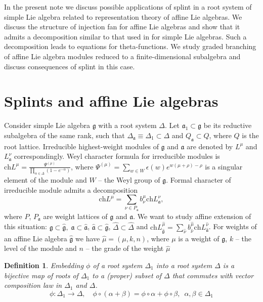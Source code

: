 \documentclass[12pt]{article}
\newtheorem{Def}{Definition}[section]
\newcommand{\gf}{\mathfrak{g}}
\newcommand{\af}{\mathfrak{a}}
\newcommand{\gfh}{\hat{\mathfrak{g}}}
\newcommand{\afh}{\hat{\mathfrak{a}}}
\begin{document}
In the present note we discuss possible applications of splint in
a root system of simple Lie algebra related to representation
theory of affine Lie algebras. We discuss the structure of
injection fan for affine Lie algebras and show that it admits a
decomposition similar to that used in \cite{2011arXiv1111.6787L}
for simple Lie algebras. Such a decomposition leads to equations
for theta-functions. We study graded branching of affine Lie
algebra modules reduced to a finite-dimensional subalgebra and
discuss consequences of splint in this case.

\section{Splints and affine Lie algebras}
\label{sec:definitions}

Consider simple Lie algebra $\gf$ with a root system $\Delta$. Let
$\af_{1}\subset \gf$ be its reductive subalgebra of the same rank, such that
$\Delta_{\af}\equiv\Delta_{1}\subset\Delta$ and $Q_{\af}\subset Q$, where $Q$ is the root lattice. Irreducible highest-weight modules of
$\gf$ and $\af$ are denoted by $L^{\mu}$ and $L^{\nu}_{\af}$
correspondingly. Weyl character formula for irreducible modules is
$\mathrm{ch}L^{\mu}=\frac{\Psi^{(\mu)}}{\prod_{\alpha\in\Delta}(1-e^{-\alpha})}$,
where $\Psi^{(\mu)}=\sum_{w\in W}\epsilon(w) e^{w(\mu+\rho)-\rho}$
is a singular element of the module and $W$ -- the Weyl group of
$\gf$. Formal character of irreducible module admits a
decomposition
\begin{equation}
  \label{eq:4}
  \mathrm{ch} L^{\mu}=\sum_{\nu\in P_{\af}} b^{\mu}_{\nu} \mathrm{ch} L^{\nu}_{\af},
\end{equation}
where $P$, $P_{\af}$ are weight lattices of $\gf$ and $\af$. We
want to study affine extension of this situation:
$\gf\subset\gfh,\; \af\subset\afh$, $\afh\subset\gfh$,
$\hat{\Delta}\subset\hat{\Delta}$ and
$\mathrm{ch}L^{\hat{\mu}}_{\gfh}=\sum_{\hat{\nu}}
b^{\hat{\mu}}_{\hat{\nu}} \mathrm{ch} L^{\hat{\nu}}_{\afh}$. For
weights of an affine Lie algebra $\gfh$ we have
$\hat{\mu}=(\mu,k,n)$, where $\mu$ is a weight of $\gf$, $k$ --
the level of the module and $n$ -- the grade of the weight
$\hat{\mu}$

\begin{Def}
  Embedding $\phi$ of a root system $\Delta_1$ into a root system $\Delta$ is a bijective map of
  roots of $\Delta_{1}$ to a (proper) subset of $\Delta$ that commutes with vector composition law
  in $\Delta_{1}$ and $\Delta$.
\begin{equation*}
\phi:\Delta_1 \longrightarrow \Delta, \quad \phi \circ (\alpha + \beta) =\phi \circ \alpha + \phi \circ \beta,\,\,\, \alpha,\beta \in \Delta_1
\end{equation*}
\end{Def}
\end{document}
